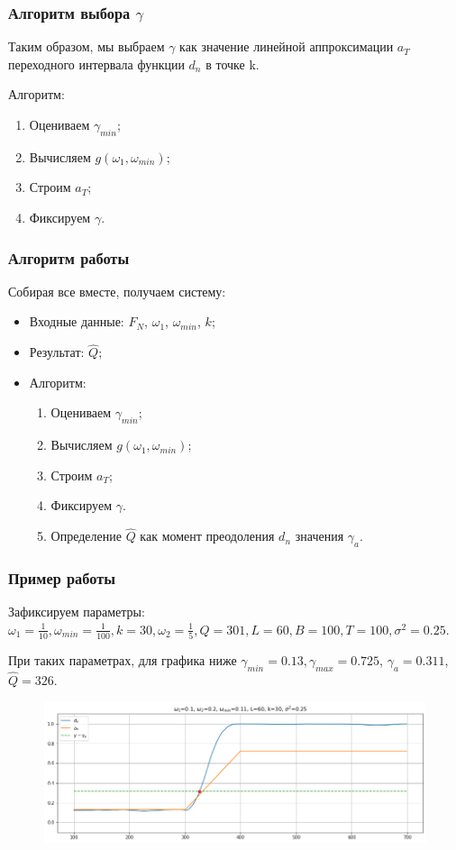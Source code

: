 \documentclass[11pt]{beamer}
\begin{document}
	\begin{frame}
		\frametitle{Алгоритм выбора $ \gamma $}
		Таким образом, мы выбраем $ \gamma $ как значение линейной аппроксимации $ a_T $ переходного интервала функции $ d_n $ в точке k.
		
		\bigskip
		Алгоритм:
		\begin{enumerate}
			\item Оцениваем $ \gamma_{min} $;
			\item Вычисляем $ g(\omega_1, \omega_{min}) $;
			\item Строим $ a_T $;
			\item Фиксируем $ \gamma $.
		\end{enumerate}
	\end{frame}

	\begin{frame}
		\frametitle{Алгоритм работы}
		Собирая все вместе, получаем систему:
		\begin{itemize}
			\item Входные данные: $ F_N $, $\omega_1$, $\omega_{min}$, $ k $;
			\item Результат: $\hat{Q}$;
			\item Алгоритм:
			\begin{enumerate}
				\item Оцениваем $ \gamma_{min} $;
				\item Вычисляем $ g(\omega_1, \omega_{min}) $;
				\item Строим $ a_T $;
				\item Фиксируем $ \gamma $.
				\item Определение $ \hat{Q} $ как момент преодоления $ d_n $ значения $ \gamma_a $.
			\end{enumerate}	
		\end{itemize}		
	\end{frame}
	
	
	
	
	\begin{frame}
		\frametitle{Пример работы}
		Зафиксируем параметры: 
		$ \omega_1=\frac{1}{10}, \omega_{min}=\frac{1}{100}, k=30, \omega_2=\frac{1}{5}, Q=301, L=60, B=100, T=100, \sigma^2=0.25 $.
		
		\bigskip
		
		При таких параметрах, для графика ниже $ \gamma_{min}=0.13, \gamma_{max} = 0.725 $,  $ \gamma_a = 0.311$, $ \hat{Q}=326 $.
		\begin{figure}[b]
			\centering
			\includegraphics[width=\linewidth]{imgs/example_system_work.png}
		\end{figure}
	\end{frame}
	
\end{document}
